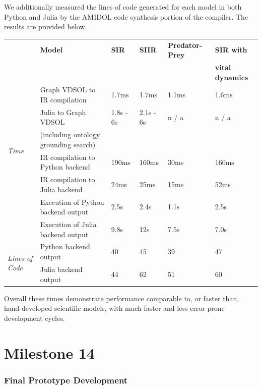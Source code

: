 \documentclass[12pt]{galois-whitepaper}
\begin{document}
We additionally measured the lines of code generated for each model in
both Python and Julia by the AMIDOL code synthesis portion of the
compiler.  The results are provided below.

{ \footnotesize
\begin{tabular}{|llllll|}
 \hline
  & \textbf{Model}	& \textbf{SIR}	& \textbf{SIIR}	& \textbf{Predator-Prey}	&
                                                  \textbf{SIR with}\\
  & & & & & \textbf{vital dynamics}\\
  \hline
   \multirow{6}{*}{\textit{Time}}     & Graph VDSOL to IR compilation	& 1.7ms	& 1.7ms	& 1.1ms	&
                                                                  1.6ms\\
  & Julia to Graph VDSOL
                & 1.8s - 6s	&2.1s - 6s	& n / a	& n / a\\
  & (including ontology grounding search) & & & &\\
        & IR compilation to Python backend	& 190ms	& 160ms & 30ms
                                                                  &
                                                                    160ms\\
        & IR compilation to Julia backend & 24ms	& 25ms	& 15ms
                                                & 52ms\\
        & Execution of Python backend output	& 2.5s	& 2.4s	& 1.1s
                                                & 2.5s\\
	& Execution of Julia backend output	& 9.8s	& 12s	& 7.5s
                                                & 7.0s\\
  \hline
  \hline
  \multirow{2}{*}{\textit{Lines of Code}} & Python backend output & 40
                                        & 45 & 39	& 47\\
        & Julia backend output	& 44	& 62	& 51	& 60\\
  \hline
\end{tabular}
}

Overall these times demonstrate performance comparable to, or faster
than, hand-developed scientific models, with much faster and less
error prone development cycles.

\part{Milestone 14}

\section{Final Prototype Development}
\end{document}
